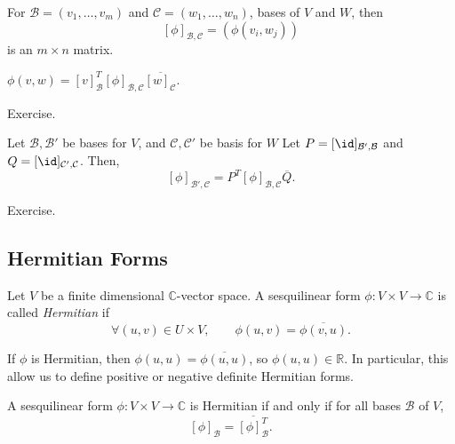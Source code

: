 \documentclass[12pt]{article}
\begin{document}
\begin{definition}
	For $\mathcal{B} = (v_1, \ldots, v_m)$ and $\mathcal{C} = (w_1, \ldots, w_n)$, bases of $V$ and $W$, then
	\[
		[\phi]_{\mathcal{B},\mathcal{C}} = (\phi(v_i, w_j))
	\]
	is an $m \times n$ matrix.
\end{definition}

\begin{lemma}
	$\phi(v, w) = [v]_{\mathcal{B}}^{T}[\phi]_{\mathcal{B},\mathcal{C}}\overline{[w]_{\mathcal{C}}}$.
\end{lemma}

\begin{proofbox}
	Exercise.
\end{proofbox}

\begin{lemma}
	Let $\mathcal{B}, \mathcal{B}'$ be bases for $V$, and $\mathcal{C},\mathcal{C}'$ be basis for $W$ Let $P = [\id]_{\mathcal{B}',\mathcal{B}}$ and $Q = [\id]_{\mathcal{C}',\mathcal{C}}$. Then,
	\[
		[\phi]_{\mathcal{B}',\mathcal{C}} = P^{T}[\phi]_{\mathcal{B},\mathcal{C}} \overline{Q}
	.\]
\end{lemma}

\begin{proofbox}
	Exercise.
\end{proofbox}

\subsection{Hermitian Forms}
\label{sub:hermitian_forms}

\begin{definition}
	Let $V$ be a finite dimensional $\mathbb{C}$-vector space. A sesquilinear form $\phi : V \times V \to \mathbb{C}$ is called \textit{Hermitian} if
	\[
		\forall (u, v) \in U \times V, \qquad \phi(u, v) = \overline{\phi(v, u)}
	.\]
\end{definition}

\begin{remark}
	If $\phi$ is Hermitian, then $\phi(u, u) = \overline{\phi(u, u)}$, so $\phi(u, u) \in \mathbb{R}$. In particular, this allow us to define positive or negative definite Hermitian forms.
\end{remark}

\begin{lemma}
	A sesquilinear form $\phi : V \times V \to \mathbb{C}$ is Hermitian if and only if for all bases $\mathcal{B}$ of $V$,
	\[
		[\phi]_{\mathcal{B}} = \overline{[\phi]_{\mathcal{B}}^{T}}
	.\]
\end{lemma}
\end{document}
